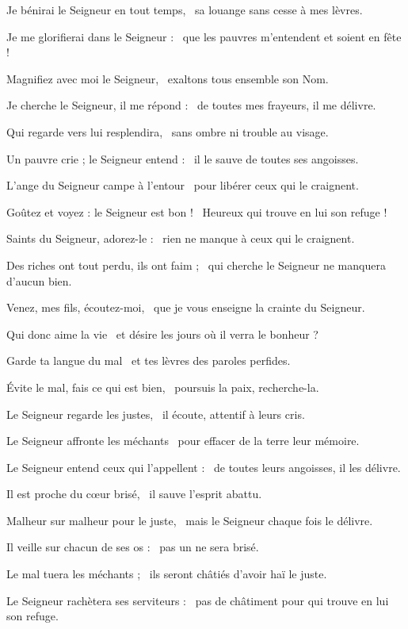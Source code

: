 \item Je bénirai le Seigneur en tout temps,~\psstar{} sa louange sans cesse à mes lèvres.
\item Je me glorifierai dans le Seigneur :~\psstar{} que les pauvres m'entendent et soient en fête !
\item Magnifiez avec moi le Seigneur,~\psstar{} exaltons tous ensemble son Nom.
\item Je cherche le Seigneur, il me répond :~\psstar{} de toutes mes frayeurs, il me délivre.
\item Qui regarde vers lui resplendira,~\psstar{} sans ombre ni trouble au visage.
\item Un pauvre crie ; le Seigneur entend :~\psstar{} il le sauve de toutes ses angoisses.
\item L'ange du Seigneur campe à l'entour~\psstar{} pour libérer ceux qui le craignent.
\item Goûtez et voyez : le Seigneur est bon !~\psstar{} Heureux qui trouve en lui son refuge !
\item Saints du Seigneur, adorez-le :~\psstar{} rien ne manque à ceux qui le craignent.
\item Des riches ont tout perdu, ils ont faim ;~\psstar{} qui cherche le Seigneur ne manquera d'aucun bien.
\item Venez, mes fils, écoutez-moi,~\psstar{} que je vous enseigne la crainte du Seigneur.
\item Qui donc aime la vie~\psstar{} et désire les jours où il verra le bonheur ?
\item Garde ta langue du mal~\psstar{} et tes lèvres des paroles perfides.
\item Évite le mal, fais ce qui est bien,~\psstar{} poursuis la paix, recherche-la.
\item Le Seigneur regarde les justes,~\psstar{} il écoute, attentif à leurs cris.
\item Le Seigneur affronte les méchants~\psstar{} pour effacer de la terre leur mémoire.
\item Le Seigneur entend ceux qui l'appellent :~\psstar{} de toutes leurs angoisses, il les délivre.
\item Il est proche du cœur brisé,~\psstar{} il sauve l'esprit abattu.
\item Malheur sur malheur pour le juste,~\psstar{} mais le Seigneur chaque fois le délivre.
\item Il veille sur chacun de ses os :~\psstar{} pas un ne sera brisé.
\item Le mal tuera les méchants ;~\psstar{} ils seront châtiés d'avoir haï le juste.
\item Le Seigneur rachètera ses serviteurs :~\psstar{} pas de châtiment pour qui trouve en lui son refuge.